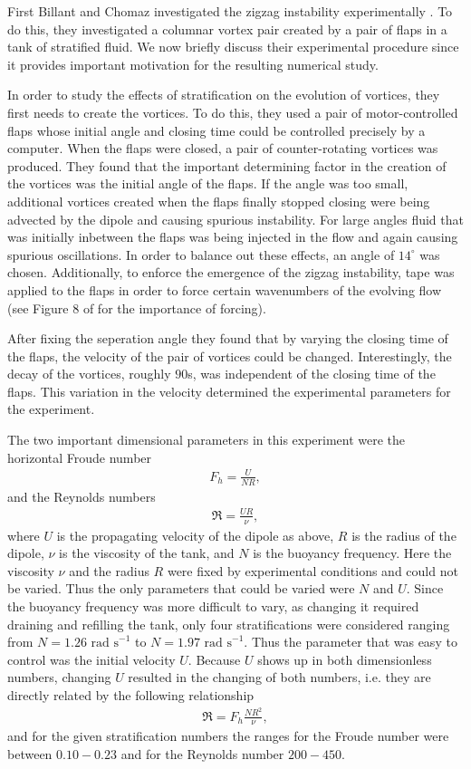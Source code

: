 First Billant and Chomaz investigated the zigzag instability experimentally \cite{bc2000a}. To do this, they investigated a columnar vortex pair created by a pair of flaps in a tank of stratified fluid. We now briefly discuss their experimental procedure since it provides important motivation for the resulting numerical study. 

In order to study the effects of stratification on the evolution of vortices, they first needs to create the vortices. To do this, they used a pair of motor-controlled flaps whose initial angle and closing time could be controlled precisely by a computer. When the flaps were closed, a pair of counter-rotating vortices was produced. They found that the important determining factor in the creation of the vortices was the initial angle of the flaps. If the angle was too small, additional vortices created when the flaps finally stopped closing were being advected by the dipole and causing spurious instability. For large angles fluid that was initially inbetween the flaps was being injected in the flow and again causing spurious oscillations. In order to balance out these effects, an angle of $14^{\circ}$ was chosen. Additionally, to enforce the emergence of the zigzag instability, tape was applied to the flaps in order to force certain wavenumbers of the evolving flow (see Figure 8 of \cite{bc2000a} for the importance of forcing).

After fixing the seperation angle they found that by varying the closing time of the flaps, the velocity of the pair of vortices could be changed. Interestingly, the decay of the vortices, roughly $90$s, was independent of the closing time of the flaps. This variation in the velocity determined the experimental parameters for the experiment. 

The two important dimensional parameters in this experiment were the horizontal Froude number 
\begin{align}
F_{h} = \frac{U}{NR},
\end{align}
and the Reynolds numbers
\begin{align}
\Re= \frac{UR}{\nu},
\end{align}
where $U$ is the propagating velocity of the dipole as above, $R$ is the radius of the dipole, $\nu$ is the viscosity of the tank, and $N$ is the buoyancy frequency. Here the viscosity $\nu$ and the radius $R$ were fixed by experimental conditions and could not be varied. Thus the only parameters that could be varied were $N$ and $U$. Since the buoyancy frequency was more difficult to vary, as changing it required draining and refilling the tank, only four stratifications were considered ranging from $N=1.26 \text{ rad s}^{-1}$ to $N=1.97 \text { rad s}^{-1}$. Thus the parameter that was easy to control was the initial velocity $U$. Because $U$ shows up in both dimensionless numbers, changing $U$ resulted in the changing of both numbers, i.e. they are directly related by the following relationship 
\begin{align}
\Re = F_{h}\frac{NR^{2}}{\nu},
\end{align} 
and for the given stratification numbers the ranges for the Froude number were between $0.10 - 0.23$ and for the Reynolds number $200-450$.

